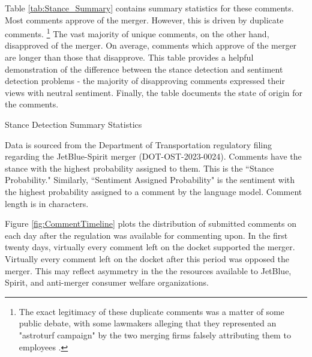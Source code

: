 \documentclass{article}
\begin{document}
\begin{appendices}
Table \ref{tab:Stance_Summary} contains summary statistics for these comments. Most comments approve of the merger. However, this is driven by duplicate comments. \footnote{The exact legitimacy of these duplicate comments was a matter of some public debate, with some lawmakers alleging that they represented an "astroturf campaign" by the two merging firms falsely attributing them to employees \citep{birnbaum_elizabeth_2023}.}  The vast majority of unique comments, on the other hand, disapproved of the merger. On average, comments which approve of the merger are longer than those that disapprove. This table provides a helpful demonstration of the difference between the stance detection and sentiment detection problems -  the majority of disapproving comments expressed their views with neutral sentiment. Finally, the table documents the state of origin for the comments. 

\begin{table}[h]
    \caption{Stance Detection Summary Statistics}
    \label{tab:Stance_Summary}
    
    \begin{minipage}{\textwidth} 
        {\footnotesize Data is sourced from the Department of Transportation regulatory filing regarding the JetBlue-Spirit merger  (DOT-OST-2023-0024). Comments have the stance with the highest probability assigned to them. This is the ``Stance Probability." Similarly, ``Sentiment Assigned Probability" is the sentiment with the highest  probability assigned to a comment by the language model. Comment length is in characters.} 
    \end{minipage}
\end{table}

Figure \ref{fig:CommentTimeline} plots the distribution of submitted comments on each day after the regulation was available for commenting upon. In the first twenty days, virtually every comment left on the docket supported the merger. Virtually every comment left on the docket after this period was opposed the merger. This may reflect asymmetry in the the resources available to JetBlue, Spirit, and anti-merger consumer welfare organizations.  


\end{appendices}
\end{document}
